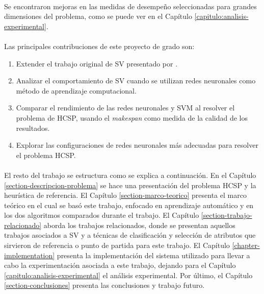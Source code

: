\paragraph{} Se encontraron mejoras en las medidas de desempeño seleccionadas para grandes dimensiones del problema, como se puede ver en el Capítulo \ref{capitulo:analisis-experimental}.

\paragraph{}Las principales contribuciones de este proyecto de grado son:
\begin{enumerate}
    \item Extender el trabajo original de SV presentado por \citet{savant-original}.
    \item Analizar el comportamiento de SV cuando se utilizan redes neuronales como método de aprendizaje computacional.
    \item Comparar el rendimiento de las redes neuronales y SVM al resolver el problema de HCSP, usando el \textit{makespan} como medida de la calidad de los resultados.    
    \item Explorar las configuraciones de redes neuronales más adecuadas para resolver el problema HCSP.
\end{enumerate}

\paragraph{} El resto del trabajo se estructura como se explica a continuación.
En el Capítulo \ref{section-descripcion-problema} se hace una presentación del problema HCSP y la heurística de referencia. El Capítulo \ref{section-marco-teorico} presenta el marco teórico en el cual se basó este trabajo, enfocado en aprendizaje automático y en los dos algoritmos comparados durante el trabajo.
El Capítulo \ref{section-trabajo-relacionado} aborda los trabajos relacionados, donde se presentan aquellos trabajos asociados a SV y a técnicas de clasificación y selección de atributos que sirvieron de referencia o punto de partida para este trabajo.
El Capítulo \ref{chapter-implementation} presenta la implementación del sistema utilizado para llevar a cabo la experimentación asociada a este trabajo, dejando para el Capítulo \ref{capitulo:analisis-experimental} el análisis experimental.
Por último, el Capítulo \ref{section-conclusiones} presenta las conclusiones y trabajo futuro.
